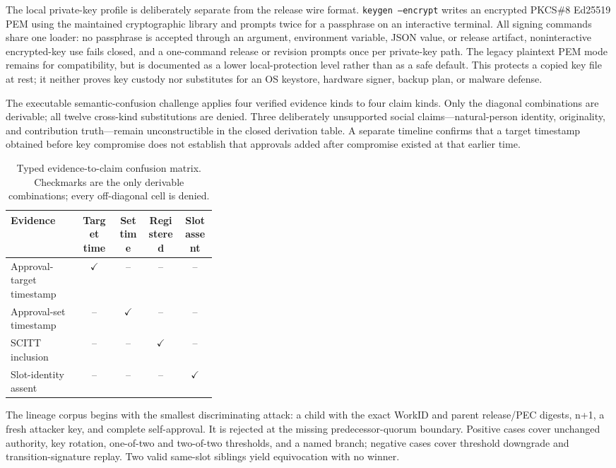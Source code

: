 \documentclass[acmsmall,screen,review,nonacm]{acmart}
\begin{document}
The local private-key profile is deliberately separate from the release wire
format. \texttt{keygen --encrypt} writes an encrypted PKCS\#8 Ed25519 PEM using
the maintained cryptographic library and prompts twice for a passphrase on an
interactive terminal. All signing commands share one loader: no passphrase is
accepted through an argument, environment variable, JSON value, or release
artifact, noninteractive encrypted-key use fails closed, and a one-command
release or revision prompts once per private-key path. The legacy plaintext PEM
mode remains for compatibility, but is documented as a lower local-protection
level rather than as a safe default. This protects a copied key file at rest;
it neither proves key custody nor substitutes for an OS keystore, hardware
signer, backup plan, or malware defense.

The executable semantic-confusion challenge applies four verified evidence
kinds to four claim kinds. Only the diagonal combinations are derivable; all
twelve cross-kind substitutions are denied. Three deliberately unsupported
social claims---natural-person identity, originality, and contribution
truth---remain unconstructible in the closed derivation table. A separate
timeline confirms that a target timestamp obtained before key compromise does
not establish that approvals added after compromise existed at that earlier
time.

\begin{table}[t]
\centering
\caption{Typed evidence-to-claim confusion matrix. Checkmarks are the only
derivable combinations; every off-diagonal cell is denied.}
\begin{tabular}{p{0.34\linewidth}cccc}
\toprule
Evidence & Target time & Set time & Registered & Slot assent \\
\midrule
Approval-target timestamp & $\checkmark$ & -- & -- & -- \\
Approval-set timestamp & -- & $\checkmark$ & -- & -- \\
SCITT inclusion & -- & -- & $\checkmark$ & -- \\
Slot-identity assent & -- & -- & -- & $\checkmark$ \\
\bottomrule
\end{tabular}
\end{table}

The lineage corpus begins with the smallest discriminating attack: a child
with the exact WorkID and parent release/PEC digests, n+1, a fresh attacker
key, and complete self-approval. It is rejected at the missing
predecessor-quorum boundary. Positive cases cover unchanged authority, key
rotation, one-of-two and two-of-two thresholds, and a named branch; negative
cases cover threshold downgrade and transition-signature replay. Two valid
same-slot siblings yield equivocation with no winner.
\end{document}
